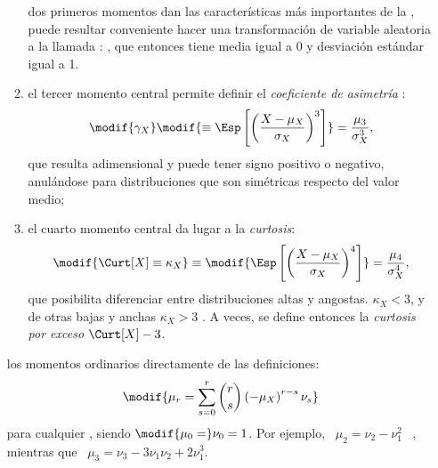 \begin{itemize}
\begin{enumerate}
  dos  primeros  momentos dan  las  caracter\'isticas  m\'as  importantes de  la
  , puede resultar  conveniente hacer una
  transformaci\'on  de  variable  aleatoria  a la  llamada  : ,
    que entonces  tiene media  igual a  0 y    desviaci\'on
  est\'andar igual a 1\modif{)}.
\item {} el tercer momento  central permite definir el
  {\it coeficiente de asimetr\'ia} :
  \[
  \modif{\gamma_X} \modif{\equiv  \Esp\left[ \left( \frac{X - \mu_X}{\sigma_X}
      \right)^3 \right]} = \frac{\mu_3}{\sigma_X^3},
  \]
   que resulta adimensional y
  puede tener  signo positivo o  negativo, anul\'andose para  distribuciones que
  son sim\'etricas respecto del valor medio;
\item  {}  el  cuarto momento  central da  lugar a  la
  \emph{curtosis}:
  \[
  \modif{\Curt[X]  \equiv \kappa_X}  \equiv \modif{\Esp\left[  \left(  \frac{X -
          \mu_X}{\sigma_X} \right)^4 \right]} = \frac{\mu_4}{\sigma_X^4},
  \]
   que posibilita diferenciar
  entre distribuciones  altas y angostas.    $\kappa_X  <  3$,  y  de otras  bajas  y  anchas  
  $\kappa_X > 3$ .  A veces,  se define entonces la {\it  curtosis por exceso}
  $\Curt[X] - 3$.
  \end{enumerate}
   los momentos ordinarios directamente de las definiciones:
  \[
  \modif{\mu_r = \sum_{s=0}^r \binom{r}{s} \left( - \mu_X \right)^{r-s} \nu_s}
  \]
  para cualquier ,  siendo $\modif{\mu_0 = } \nu_0=1$.  Por
  ejemplo, \ $\mu_2=\nu_2-\nu_1^2$ \ , mientras que \ $\mu_3=\nu_3-3\nu_1\nu_2+2\nu_1^3$.
\end{itemize}

